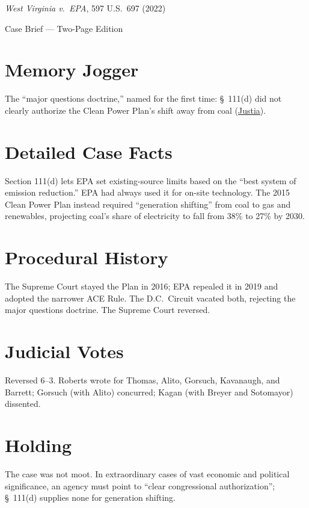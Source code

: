 \documentclass[12pt]{article}
\begin{document}
\begin{center}
{\LARGE \textit{West Virginia v.\ EPA}, 597 U.S.\ 697 (2022)\par}
\vspace{0.5em}
{\large Case Brief --- Two-Page Edition\par}
\end{center}

\section{Memory Jogger}
The ``major questions doctrine,'' named for the first time: \S~111(d) did not clearly authorize the Clean Power Plan's shift away from coal (\href{https://supreme.justia.com/cases/federal/us/597/20-1530/}{Justia}).

\section{Detailed Case Facts}
Section 111(d) lets EPA set existing-source limits based on the ``best system of emission reduction.'' EPA had always used it for on-site technology. The 2015 Clean Power Plan instead required ``generation shifting'' from coal to gas and renewables, projecting coal's share of electricity to fall from 38\% to 27\% by 2030.

\section{Procedural History}
The Supreme Court stayed the Plan in 2016; EPA repealed it in 2019 and adopted the narrower ACE Rule. The D.C.\ Circuit vacated both, rejecting the major questions doctrine. The Supreme Court reversed.

\section{Judicial Votes}
Reversed 6--3. Roberts wrote for Thomas, Alito, Gorsuch, Kavanaugh, and Barrett; Gorsuch (with Alito) concurred; Kagan (with Breyer and Sotomayor) dissented.

\section{Holding}
The case was not moot. In extraordinary cases of vast economic and political significance, an agency must point to ``clear congressional authorization''; \S~111(d) supplies none for generation shifting.
\end{document}
